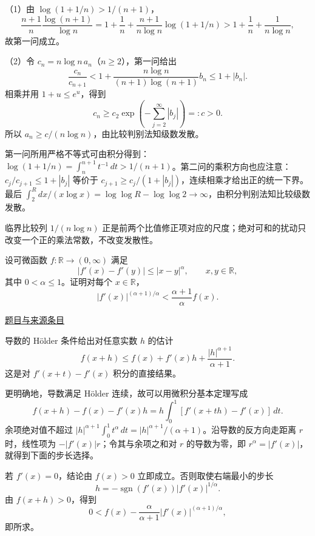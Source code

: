 \documentclass[12pt,fontset=fandol]{ctexart}
\begin{document}
\begin{solve}\label{ans:pre10-math:5}

（1）由 $\log(1+1/n)>1/(n+1)$，
\[
\frac{n+1}{n}\frac{\log(n+1)}{\log n}
=1+\frac1n+\frac{n+1}{n\log n}\log(1+1/n)
>1+\frac1n+\frac1{n\log n},
\]
故第一问成立。

（2）令 $c_n=n\log n\,a_n$（$n\ge2$），第一问给出
\[
\frac{c_n}{c_{n+1}}
<1+\frac{n\log n}{(n+1)\log(n+1)}b_n
\le1+|b_n|.
\]
相乘并用 $1+u\le e^u$，得到
\[
c_n\ge c_2\exp\!\left(-\sum_{j=2}^\infty|b_j|\right)=:c>0.
\]
所以 $a_n\ge c/(n\log n)$，由比较判别法知级数发散。

第一问所用严格不等式可由积分得到：$\log(1+1/n)=\int_n^{n+1}t^{-1}\,dt>1/(n+1)$。第二问的乘积方向也应注意：$c_j/c_{j+1}\le1+|b_j|$ 等价于 $c_{j+1}\ge c_j/(1+|b_j|)$，连续相乘才给出正的统一下界。最后 $\int_2^R dx/(x\log x)=\log\log R-\log\log2\to\infty$，由积分判别法知比较级数发散。

\end{solve}

\begin{remark}[方法与条件]临界比较列 $1/(n\log n)$ 正是前两个比值修正项对应的尺度；绝对可和的扰动只改变一个正的乘法常数，不改变发散性。\end{remark}

\begin{example}[来源序号6]\label{ex:pre10-math:6}\label{pr:pre10-math:6}

设可微函数 $f:\mathbb R\to(0,\infty)$ 满足
\[
|f'(x)-f'(y)|\le|x-y|^\alpha,\qquad x,y\in\mathbb R,
\]
其中 $0<\alpha\le1$。证明对每个 $x\in\mathbb R$，
\[
|f'(x)|^{(\alpha+1)/\alpha}<\frac{\alpha+1}{\alpha}f(x).
\]

\par\href{https://github.com/lzxcr/cmc-mathematics/blob/64916fa1fdbc3e444a652eca204d5669058ee321/src/problems/preliminary/10/06.md}{题目与来源条目}

\end{example}

\begin{solve}\label{ans:pre10-math:6}

导数的 Hölder 条件给出对任意实数 $h$ 的估计
\[
f(x+h)\le f(x)+f'(x)h+\frac{|h|^{\alpha+1}}{\alpha+1}.
\]
这是对 $f'(x+t)-f'(x)$ 积分的直接结果。

更明确地，导数满足 Hölder 连续，故可以用微积分基本定理写成
\[
f(x+h)-f(x)-f'(x)h
=h\int_0^1[f'(x+th)-f'(x)]\,dt.
\]
余项绝对值不超过 $|h|^{\alpha+1}\int_0^1t^\alpha\,dt=|h|^{\alpha+1}/(\alpha+1)$。沿导数的反方向走距离 $r$ 时，线性项为 $-|f'(x)|r$；令其与余项之和对 $r$ 的导数为零，即 $r^\alpha=|f'(x)|$，就得到下面的步长选择。

若 $f'(x)=0$，结论由 $f(x)>0$ 立即成立。否则取使右端最小的步长
\[
h=-\operatorname{sgn}(f'(x))|f'(x)|^{1/\alpha}.
\]
由 $f(x+h)>0$，得到
\[
0<f(x)-\frac\alpha{\alpha+1}|f'(x)|^{(\alpha+1)/\alpha},
\]
即所求。

\end{solve}
\end{document}

